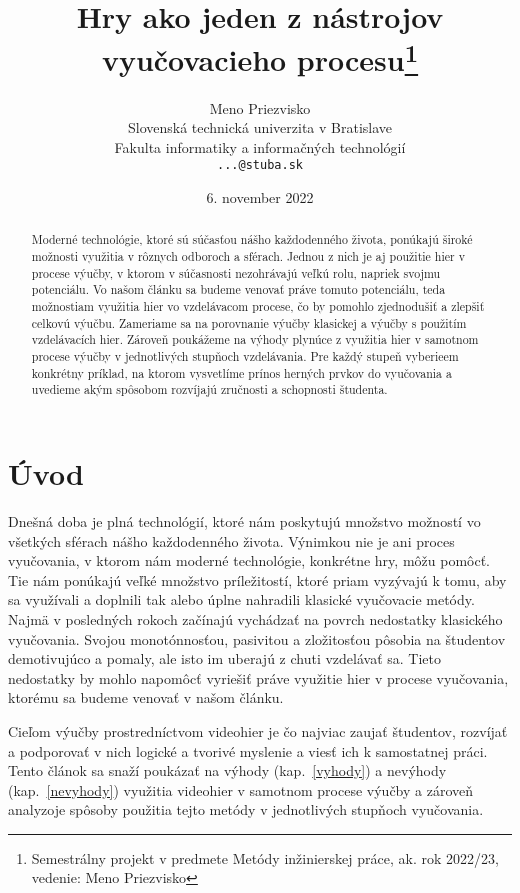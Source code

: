 \documentclass[10pt,twoside,slovak,a4paper]{article}
\title{Hry ako jeden z nástrojov vyučovacieho procesu\thanks{Semestrálny projekt v predmete Metódy inžinierskej práce, ak. rok 2022/23, vedenie: Meno Priezvisko}}
\author{Meno Priezvisko\\[2pt]
	{\small Slovenská technická univerzita v Bratislave}\\
	{\small Fakulta informatiky a informačných technológií}\\
	{\small \texttt{...@stuba.sk}}
	}
\date{\small 6. november 2022}
\begin{document}
\maketitle

\begin{abstract}

Moderné technológie, ktoré sú súčasťou nášho každodenného života, ponúkajú široké možnosti využitia v rôznych odboroch a sférach. Jednou z nich je aj použitie hier v procese výučby, v ktorom v súčasnosti nezohrávajú veľkú rolu, napriek svojmu potenciálu. Vo našom článku sa budeme venovať práve tomuto potenciálu, teda možnostiam využitia hier vo vzdelávacom procese, čo by pomohlo zjednodušiť a zlepšiť celkovú výučbu. Zameriame sa na porovnanie výučby klasickej a výučby s použitím vzdelávacích hier. Zároveň poukážeme na výhody plynúce z využitia hier v samotnom procese výučby v jednotlivých stupňoch vzdelávania. Pre každý stupeň vyberieem konkrétny príklad, na ktorom vysvetlíme prínos herných prvkov do vyučovania a uvedieme akým spôsobom rozvíjajú zručnosti a schopnosti študenta.

\end{abstract}



\section{Úvod}

Dnešná doba je plná technológií, ktoré nám poskytujú množstvo možností vo všetkých sférach nášho každodenného života. Výnimkou nie je ani proces vyučovania, v ktorom nám moderné technológie, konkrétne hry\cite{Zea2009-eh}, môžu pomôcť. Tie nám ponúkajú veľké množstvo príležitostí, ktoré priam vyzývajú k tomu, aby sa využívali a doplnili tak alebo úplne nahradili klasické vyučovacie metódy. Najmä v posledných rokoch začínajú vychádzať na povrch nedostatky klasického vyučovania. Svojou monotónnosťou, pasivitou a zložitosťou pôsobia na študentov demotivujúco a pomaly, ale isto im uberajú z chuti vzdelávať sa. Tieto nedostatky by mohlo napomôcť vyriešiť práve využitie hier v procese vyučovania, ktorému sa budeme venovať v našom článku. 

Cieľom výučby prostredníctvom videohier je čo najviac zaujať študentov, rozvíjať a podporovať v nich logické a tvorivé myslenie a viesť ich k samostatnej práci\cite{Chen2012-ao}. Tento článok sa snaží poukázať na výhody (kap.~\ref{vyhody}) a nevýhody (kap.~\ref{nevyhody}) využitia videohier v samotnom procese výučby a zároveň analyzoje spôsoby použitia tejto metódy v jednotlivých stupňoch vyučovania.
\end{document}
